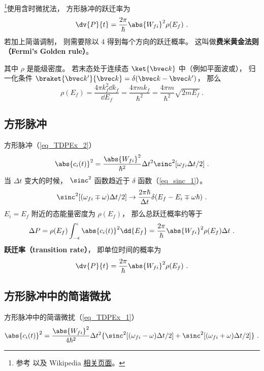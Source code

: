 

\footnote{参考 \cite{Bransden} 以及 Wikipedia \href{https://en.wikipedia.org/wiki/Fermi's_golden_rule}{相关页面}。}使用含时微扰法， 方形脉冲的跃迁率为
\begin{equation} %
\dv{P}{t} = \frac{2\pi}{\hbar} \abs{W_{fi}}^2\rho(E_f)~.
\end{equation}
若加上简谐调制， 则需要除以 4 得到每个方向的跃迁概率。 这叫做\textbf{费米黄金法则（Fermi's Golden rule）}。

其中 $\rho$ 是能级密度。 若末态处于连续态 $\ket{\bvec k}$ 中（例如平面波或）， 归一化条件 $\braket{\bvec k'}{\bvec k} = \delta(\bvec k - \bvec k')$， 那么
\begin{equation}
\rho(E_f) = \frac{4\pi k_f^2\dd{k_f}}{\dd{E_f}} = \frac{4\pi m k_f}{\hbar^2} = \frac{4\pi m}{\hbar^2}\sqrt{2mE_f}~.
\end{equation}

\subsection{方形脉冲}
方形脉冲（\autoref{eq_TDPEx_2}）
\begin{equation}
\abs{c_i(t)}^2 = \frac{\abs{W_{fi}}^2}{\hbar^2} \Delta t^2 \sinc^2[\omega_{fi}\Delta t/2]~.
\end{equation}
当 $\Delta t$ 变大的时候， $\sinc^2$ 函数趋近于 $\delta$ 函数（\autoref{eq_sinc_1}）。
\begin{equation}
\sinc^2[(\omega_{fi}\mp\omega)\Delta t/2] \to \frac{2\pi\hbar}{\Delta t}\delta(E_f - E_i \mp \omega\hbar)~.
\end{equation}
$E_i=E_f$ 附近的态能量密度为 $\rho(E_f)$， 那么总跃迁概率约等于
\begin{equation}
\Delta P = \rho(E_f)\int_{-\epsilon}^{\epsilon}\abs{c_i(t)}^2 \dd{E_f}
= \frac{2\pi}{\hbar} \abs{W_{fi}}^2\rho(E_f)\Delta t~.
\end{equation}
\textbf{跃迁率（transition rate）}， 即单位时间的概率为
\begin{equation}
\dv{P}{t} = \frac{2\pi}{\hbar} \abs{W_{fi}}^2\rho(E_f)~.
\end{equation}

\subsection{方形脉冲中的简谐微扰}
方形脉冲中的简谐微扰（\autoref{eq_TDPEx_1}）
\begin{equation}
\abs{c_i(t)}^2 = \frac{\abs{W_{fi}}^2}{4\hbar^2} \Delta t^2 \{\sinc^2[(\omega_{fi}-\omega)\Delta t/2] + \sinc^2[(\omega_{fi}+\omega)\Delta t/2]\}~.
\end{equation}

